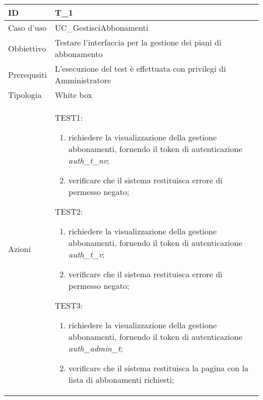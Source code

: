 \begin{table}[hb]
    \centering
    \begin{tabular}{ |p{2cm}|p{10cm}|  }
        \hline
        ID          & T\_1                                                               \\\hline
        Caso d'uso  & UC\_GestisciAbbonamenti                                            \\\hline
        Obbiettivo  & Testare l'interfaccia per la gestione dei piani di abbonamento     \\\hline
        Prerequsiti & L'esecuzione del test è effettuata con privilegi di Amministratore \\\hline
        Tipologia   & White box                                                          \\\hline
        Azioni      &
        TEST1:
        \begin{enumerate}[nosep, topsep=0pt]
            \item richiedere la visualizzazione della gestione abbonamenti, fornendo il token di autenticazione \emph{auth\_t\_nv};
            \item verificare che il sistema restituisca errore di permesso negato;
        \end{enumerate}
        \vspace{0.5cm} TEST2:
        \begin{enumerate}[nosep, topsep=0pt]
            \item richiedere la visualizzazione della gestione abbonamenti, fornendo il token di autenticazione \emph{auth\_t\_v};
            \item verificare che il sistema restituisca errore di permesso negato;
        \end{enumerate}
        \vspace{0.5cm}TEST3:
        \begin{enumerate}[nosep, topsep=0pt]
            \item richiedere la visualizzazione della gestione abbonamenti, fornendo il token di autenticazione \emph{auth\_admin\_t};
            \item verificare che il sistema restituisca la pagina con la lista di abbonamenti richiesti;
        \end{enumerate}
        \\\hline
    \end{tabular}
\end{table}

